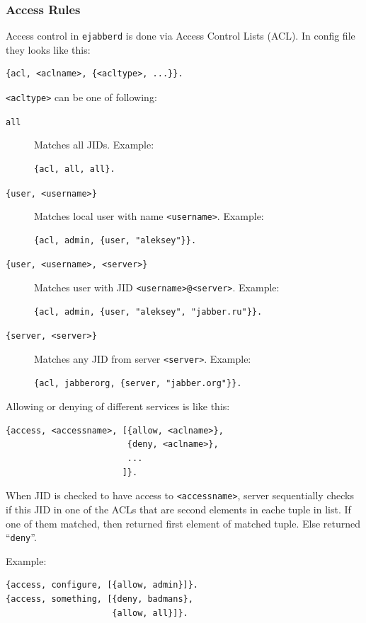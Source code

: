 \documentclass[10pt]{article}
\newcommand{\ejabberd}{\texttt{ejabberd}}
\begin{document}
\subsubsection{Access Rules}
\label{sec:configaccess}

Access control in \ejabberd{} is done via Access Control Lists (ACL).  In
config file they looks like this:
\begin{verbatim}
{acl, <aclname>, {<acltype>, ...}}.
\end{verbatim}

\texttt{<acltype>} can be one of following:
\begin{description}
\item[\texttt{all}] Matches all JIDs.  Example:
\begin{verbatim}
{acl, all, all}.
\end{verbatim}
\item[\texttt{\{user, <username>\}}] Matches local user with name
  \texttt{<username>}.  Example:
\begin{verbatim}
{acl, admin, {user, "aleksey"}}.
\end{verbatim}
\item[\texttt{\{user, <username>, <server>\}}] Matches user with JID
  \texttt{<username>@<server>}.  Example:
\begin{verbatim}
{acl, admin, {user, "aleksey", "jabber.ru"}}.
\end{verbatim}
\item[\texttt{\{server, <server>\}}] Matches any JID from server
  \texttt{<server>}.  Example:
\begin{verbatim}
{acl, jabberorg, {server, "jabber.org"}}.
\end{verbatim}
\end{description}

Allowing or denying of different services is like this:
\begin{verbatim}
{access, <accessname>, [{allow, <aclname>},
                        {deny, <aclname>},
                        ...
                       ]}.
\end{verbatim}
When JID is checked to have access to \texttt{<accessname>}, server
sequentially checks if this JID in one of the ACLs that are second elements in
eache tuple in list.  If one of them matched, then returned first element of
matched tuple.  Else returned ``\texttt{deny}''.

Example:
\begin{verbatim}
{access, configure, [{allow, admin}]}.
{access, something, [{deny, badmans},
                     {allow, all}]}.
\end{verbatim}
\end{document}
